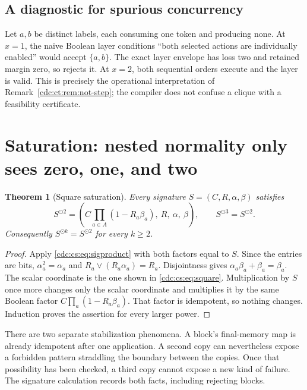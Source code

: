 \documentclass[11pt,a4paper]{article}
\newtheorem{theorem}{Theorem}[section]
\theoremstyle{definition}
\theoremstyle{remark}
\newcommand{\srctag}[1]{\texorpdfstring{\hspace{0.5em}{\normalfont\small\color{accent}[#1]}}{ [#1]}}
\begin{document}
\subsection{A diagnostic for spurious concurrency}
Let $a,b$ be distinct labels, each consuming one token and producing none. At $x=1$, the naive Boolean layer conditions ``both selected actions are individually enabled'' would accept $\{a,b\}$. The exact layer envelope has loss two and retained margin zero, so rejects it. At $x=2$, both sequential orders execute and the layer is valid. This is precisely the operational interpretation of Remark~\ref{cdc:ct:rem:not-step}; the compiler does not confuse a clique with a feasibility certificate.


\section{Saturation: nested normality only sees zero, one, and two\srctag{06}}
\label{cdc:cs:sec:saturation}

\begin{theorem}[Square saturation]
\label{cdc:cs:thm:squaresaturation}
Every signature $S=(C,R,\alpha,\beta)$ satisfies
\begin{equation}
\label{cdc:cs:eq:square}
S^{\odot2}=
\left(C\prod_{a\in A}(1-R_a\beta_a),\ R,\ \alpha,\ \beta\right),
\qquad S^{\odot3}=S^{\odot2}.
\end{equation}
Consequently $S^{\odot k}=S^{\odot2}$ for every $k\geq2$.
\end{theorem}

\begin{proof}
Apply \eqref{cdc:cs:eq:sigproduct} with both factors equal to $S$.
Since the entries are bits,
$\alpha_a^2=\alpha_a$ and
$R_a\lor(R_a\alpha_a)=R_a$. Disjointness gives
$\alpha_a\beta_a+\beta_a=\beta_a$. The scalar coordinate is the one shown in
\eqref{cdc:cs:eq:square}. Multiplication by $S$ once more changes only the scalar
coordinate and multiplies it by the same Boolean factor
$C\prod_a(1-R_a\beta_a)$. That factor is idempotent, so nothing changes.
Induction proves the assertion for every larger power.
\end{proof}

There are two separate stabilization phenomena. A block's final-memory map
is already idempotent after one application. A second copy can nevertheless
expose a forbidden pattern straddling the boundary between the copies. Once
that possibility has been checked, a third copy cannot expose a new kind of
failure. The signature calculation records both facts, including rejecting
blocks.
\end{document}
